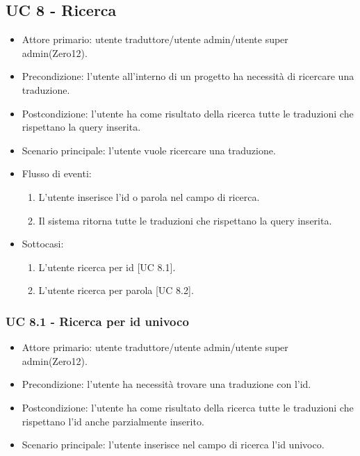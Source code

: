 \subsection{UC 8 - Ricerca}
    \begin{itemize}
        \item Attore primario: utente traduttore/utente admin/utente super admin(Zero12).
        \item Precondizione: l'utente all'interno di un progetto ha necessità di ricercare una traduzione.
        \item Postcondizione: l'utente ha come risultato della ricerca tutte le traduzioni che rispettano la query inserita.
        \item Scenario principale: l'utente vuole ricercare una traduzione.
        \item Flusso di eventi:
            \begin{enumerate}
                \item L'utente inserisce l'id o parola nel campo di ricerca.
                \item Il sistema ritorna tutte le traduzioni che rispettano la query inserita.
            \end{enumerate}
        \item Sottocasi:
                \begin{enumerate}
                    \item L'utente ricerca per id [UC 8.1].
                    \item L'utente ricerca per parola [UC 8.2].
                \end{enumerate}
    \end{itemize}
    \subsubsection{UC 8.1 - Ricerca per id univoco}
        \begin{itemize}
            \item Attore primario: utente traduttore/utente admin/utente super admin(Zero12).
            \item Precondizione: l'utente ha necessità trovare una traduzione con l'id.
            \item Postcondizione: l'utente ha come risultato della ricerca tutte le traduzioni che rispettano l'id anche parzialmente inserito.
            \item Scenario principale: l'utente inserisce nel campo di ricerca l'id univoco.
        \end{itemize}
